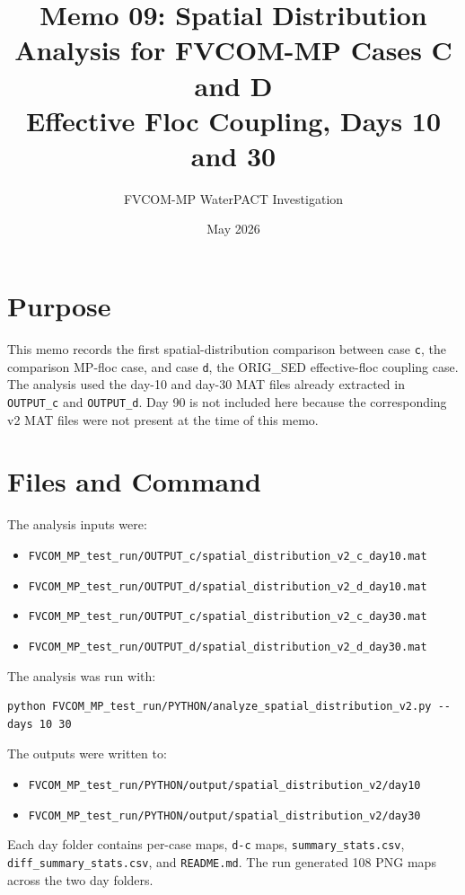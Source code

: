 \documentclass[11pt]{article}
\title{Memo 09: Spatial Distribution Analysis for FVCOM-MP Cases C and D\\
       Effective Floc Coupling, Days 10 and 30}
\author{FVCOM-MP WaterPACT Investigation}
\date{May 2026}
\begin{document}
\sloppy
\maketitle

\section*{Purpose}

This memo records the first spatial-distribution comparison between case
\texttt{c}, the comparison MP-floc case, and case \texttt{d}, the
ORIG\_SED effective-floc coupling case.  The analysis used the day-10 and
day-30 MAT files already extracted in \texttt{OUTPUT\_c} and
\texttt{OUTPUT\_d}.  Day 90 is not included here because the corresponding
v2 MAT files were not present at the time of this memo.

\section*{Files and Command}

The analysis inputs were:
\begin{itemize}
  \item \texttt{FVCOM\_MP\_test\_run/OUTPUT\_c/spatial\_distribution\_v2\_c\_day10.mat}
  \item \texttt{FVCOM\_MP\_test\_run/OUTPUT\_d/spatial\_distribution\_v2\_d\_day10.mat}
  \item \texttt{FVCOM\_MP\_test\_run/OUTPUT\_c/spatial\_distribution\_v2\_c\_day30.mat}
  \item \texttt{FVCOM\_MP\_test\_run/OUTPUT\_d/spatial\_distribution\_v2\_d\_day30.mat}
\end{itemize}

The analysis was run with:
\begin{verbatim}
python FVCOM_MP_test_run/PYTHON/analyze_spatial_distribution_v2.py --days 10 30
\end{verbatim}

The outputs were written to:
\begin{itemize}
  \item \texttt{FVCOM\_MP\_test\_run/PYTHON/output/spatial\_distribution\_v2/day10}
  \item \texttt{FVCOM\_MP\_test\_run/PYTHON/output/spatial\_distribution\_v2/day30}
\end{itemize}
Each day folder contains per-case maps, \texttt{d-c} maps,
\texttt{summary\_stats.csv}, \texttt{diff\_summary\_stats.csv}, and
\texttt{README.md}.  The run generated 108 PNG maps across the two day folders.
\end{document}
